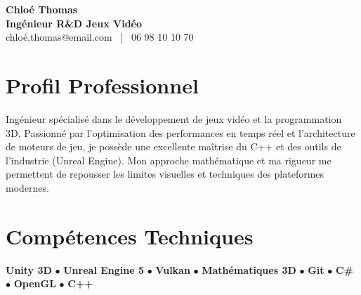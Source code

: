 \documentclass[11pt,a4paper]{article}
\begin{document}
\begin{center}
    {\Huge \textbf{Chloé Thomas}} \\[0.2cm]
    {\Large \textbf{Ingénieur R\&D Jeux Vidéo}} \\[0.1cm]
    chloé.thomas@email.com \ | \ 06 98 10 10 70
\end{center}

\vspace{0.3cm}

\section*{Profil Professionnel}
\noindent
Ingénieur spécialisé dans le développement de jeux vidéo et la programmation 3D. Passionné par l'optimisation des performances en temps réel et l'architecture de moteurs de jeu, je possède une excellente maîtrise du C++ et des outils de l'industrie (Unreal Engine). Mon approche mathématique et ma rigueur me permettent de repousser les limites visuelles et techniques des plateformes modernes.

\vspace{0.3cm}

\section*{Compétences Techniques}
\noindent
\textbf{Unity 3D} $\bullet$ \textbf{Unreal Engine 5} $\bullet$ \textbf{Vulkan} $\bullet$ \textbf{Mathématiques 3D} $\bullet$ \textbf{Git} $\bullet$ \textbf{C\#} $\bullet$ \textbf{OpenGL} $\bullet$ \textbf{C++}

\vspace{0.3cm}

\end{document}
